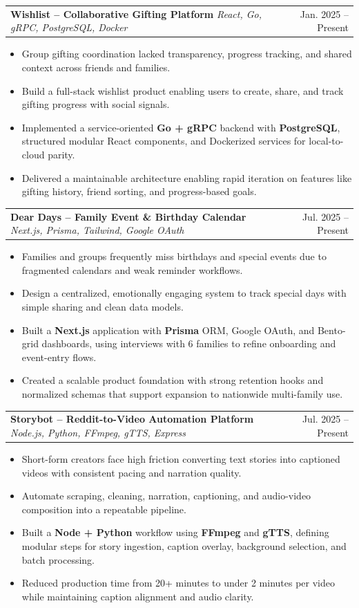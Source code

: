 \documentclass[letterpaper,11pt]{article}
\makeatletter
\newcommand{\resumeItem}[1]{
  \item\small{#1 \vspace{-2pt}}
}
\newcommand{\resumeProjectHeading}[2]{
  \item
    \begin{tabular*}{0.97\textwidth}{l@{\extracolsep{\fill}}r}
      \small#1 & #2 \\
    \end{tabular*}\vspace{-7pt}
}
\newcommand{\resumeItemListStart}{\begin{itemize}}
\newcommand{\resumeItemListEnd}{\end{itemize}\vspace{-5pt}}
\makeatother
\begin{document}
  \resumeProjectHeading
    {\textbf{Wishlist – Collaborative Gifting Platform} \emph{\textbar{} React, Go, gRPC, PostgreSQL, Docker}}
    {Jan. 2025 -- Present}
    \resumeItemListStart
      \resumeItem{Group gifting coordination lacked transparency, progress tracking, and shared context across friends and families.}
      \resumeItem{Build a full-stack wishlist product enabling users to create, share, and track gifting progress with social signals.}
      \resumeItem{Implemented a service-oriented \textbf{Go + gRPC} backend with \textbf{PostgreSQL}, structured modular React components, and Dockerized services for local-to-cloud parity.}
      \resumeItem{Delivered a maintainable architecture enabling rapid iteration on features like gifting history, friend sorting, and progress-based goals.}
    \resumeItemListEnd

  \resumeProjectHeading
    {\textbf{Dear Days – Family Event \& Birthday Calendar} \emph{\textbar{} Next.js, Prisma, Tailwind, Google OAuth}}
    {Jul. 2025 -- Present}
    \resumeItemListStart
      \resumeItem{Families and groups frequently miss birthdays and special events due to fragmented calendars and weak reminder workflows.}
      \resumeItem{Design a centralized, emotionally engaging system to track special days with simple sharing and clean data models.}
      \resumeItem{Built a \textbf{Next.js} application with \textbf{Prisma} ORM, Google OAuth, and Bento-grid dashboards, using interviews with 6 families to refine onboarding and event-entry flows.}
      \resumeItem{Created a scalable product foundation with strong retention hooks and normalized schemas that support expansion to nationwide multi-family use.}
    \resumeItemListEnd

  \resumeProjectHeading
    {\textbf{Storybot – Reddit-to-Video Automation Platform} \emph{\textbar{} Node.js, Python, FFmpeg, gTTS, Express}}
    {Jul. 2025 -- Present}
    \resumeItemListStart
      \resumeItem{Short-form creators face high friction converting text stories into captioned videos with consistent pacing and narration quality.}
      \resumeItem{Automate scraping, cleaning, narration, captioning, and audio-video composition into a repeatable pipeline.}
      \resumeItem{Built a \textbf{Node + Python} workflow using \textbf{FFmpeg} and \textbf{gTTS}, defining modular steps for story ingestion, caption overlay, background selection, and batch processing.}
      \resumeItem{Reduced production time from 20+ minutes to under 2 minutes per video while maintaining caption alignment and audio clarity.}
    \resumeItemListEnd
\end{document}
